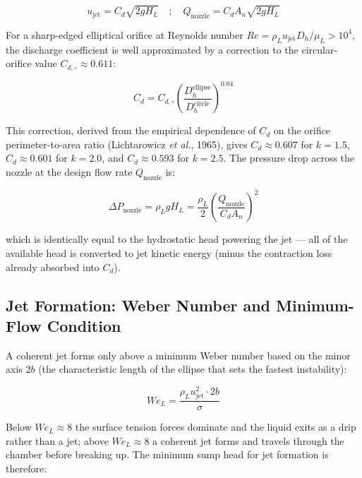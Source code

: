 \documentclass[11pt,letterpaper]{article}
\newcommand{\rhoL}{\rho_L}
\newcommand{\ujet}{u_{\mathrm{jet}}}
\newcommand{\We}{\mathit{We}}
\newcommand{\Rey}{\mathit{Re}}
\begin{document}
\begin{equation}
  \ujet = C_d \sqrt{2g H_L}
  \quad;\quad
  Q_{\mathrm{nozzle}} = C_d A_n \sqrt{2g H_L}
  \label{eq:jet_velocity}
\end{equation}

For a sharp-edged elliptical orifice at Reynolds number $\Rey =
\rhoL \ujet D_h / \mu_L > 10^4$, the discharge coefficient is well
approximated by a correction to the circular-orifice value $C_{d,\circ}
\approx 0.611$:

\begin{equation}
  C_d = C_{d,\circ}
        \left(\frac{D_h^{\mathrm{ellipse}}}{D_h^{\mathrm{circle}}}\right)^{0.04}
  \label{eq:cd_ellipse}
\end{equation}

This correction, derived from the empirical dependence of $C_d$ on the
orifice perimeter-to-area ratio (Lichtarowicz \textit{et al.}, 1965), gives
$C_d \approx 0.607$ for $k = 1.5$, $C_d \approx 0.601$ for $k = 2.0$,
and $C_d \approx 0.593$ for $k = 2.5$.  The pressure drop across the
nozzle at the design flow rate $Q_{\mathrm{nozzle}}$ is:

\begin{equation}
  \Delta P_{\mathrm{nozzle}} = \rhoL g H_L
  = \frac{\rhoL}{2}\left(\frac{Q_{\mathrm{nozzle}}}{C_d A_n}\right)^{\!2}
  \label{eq:nozzle_dp}
\end{equation}

which is identically equal to the hydrostatic head powering the jet ---
all of the available head is converted to jet kinetic energy (minus the
contraction loss already absorbed into $C_d$).

\subsection{Jet Formation: Weber Number and Minimum-Flow Condition}
\label{sec:weber}

A coherent jet forms only above a minimum Weber number based on the minor
axis $2b$ (the characteristic length of the ellipse that sets the fastest
instability):

\begin{equation}
  \We_L = \frac{\rhoL \ujet^2 \cdot 2b}{\sigma}
  \label{eq:weber}
\end{equation}

Below $\We_L \approx 8$ the surface tension forces dominate and the liquid
exits as a drip rather than a jet; above $\We_L \approx 8$ a coherent jet
forms and travels through the chamber before breaking up.  The minimum
sump head for jet formation is therefore:
\end{document}
